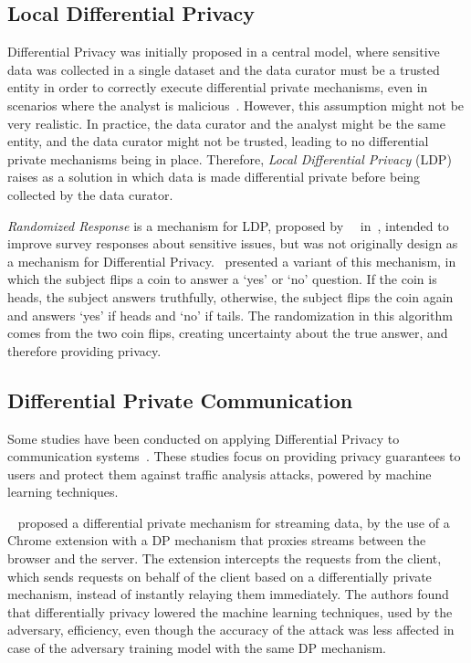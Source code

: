 \subsection{Local Differential Privacy}\label{subsec:local_differential_privacy}

Differential Privacy was initially proposed in a central model, where sensitive data was collected in a single dataset and the data curator must be a trusted entity in order to correctly execute differential private mechanisms, even in scenarios where the analyst is malicious~\cite{DP_Book}. However, this assumption might not be very realistic. In practice, the data curator and the analyst might be the same entity, and the data curator might not be trusted, leading to no differential private mechanisms being in place. Therefore, \textit{Local Differential Privacy} (LDP) raises as a solution in which data is made differential private before being collected by the data curator.

\textit{Randomized Response} is a mechanism for LDP, proposed by~\citeauthor{RandomizedResponse}~\cite{RandomizedResponse} in~\citeyear{RandomizedResponse}, intended to improve survey responses about sensitive issues, but was not originally design as a mechanism for Differential Privacy.~\citeauthor{AlgFoundationsDP} presented a variant of this mechanism, in which the subject flips a coin to answer a `yes' or `no' question. If the coin is heads, the subject answers truthfully, otherwise, the subject flips the coin again and answers `yes' if heads and `no' if tails. The randomization in this algorithm comes from the two coin flips, creating uncertainty about the true answer, and therefore providing privacy.


\subsection{Differential Private Communication}\label{subsec:diff_priv_comm}

Some studies have been conducted on applying Differential Privacy to communication systems~\cite{VilalongaINForum, StatPrivStreaming, NetShaper}. These studies focus on providing privacy guarantees to users and protect them against traffic analysis attacks, powered by machine learning techniques.

\citeauthor{StatPrivStreaming}~\cite{StatPrivStreaming} proposed a differential private mechanism for streaming data, by the use of a Chrome extension with a DP mechanism that proxies streams between the browser and the server. The extension intercepts the requests from the client, which sends requests on behalf of the client based on a differentially private mechanism, instead of instantly relaying them immediately. The authors found that differentially privacy lowered the machine learning techniques, used by the adversary, efficiency, even though the accuracy of the attack was less affected in case of the adversary training model with the same DP mechanism.

